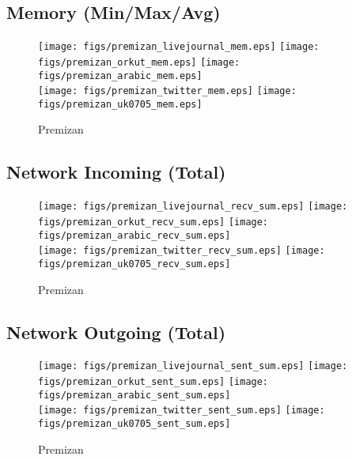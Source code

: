 \documentclass{article}
\newcommand{\bline}[1][1]{\vspace{#1\baselineskip}}
\begin{document}
\subsection{Memory (Min/Max/Avg)}
\begin{figure}[!h]
  \centering
  \texttt{[image: figs/premizan\_livejournal\_mem.eps]}\hspace{1em}%
  \texttt{[image: figs/premizan\_orkut\_mem.eps]}\hspace{1em}%
  \texttt{[image: figs/premizan\_arabic\_mem.eps]}\\
  \texttt{[image: figs/premizan\_twitter\_mem.eps]}\hspace{1em}%
  \texttt{[image: figs/premizan\_uk0705\_mem.eps]}
  \caption{Premizan}
\end{figure}

\pagebreak
\subsection{Network Incoming (Total)}
\begin{figure}[!h]
  \bline[1]
  \centering
  \texttt{[image: figs/premizan\_livejournal\_recv\_sum.eps]}\hspace{1em}%
  \texttt{[image: figs/premizan\_orkut\_recv\_sum.eps]}\hspace{1em}%
  \texttt{[image: figs/premizan\_arabic\_recv\_sum.eps]}\\
  \texttt{[image: figs/premizan\_twitter\_recv\_sum.eps]}\hspace{1em}%
  \texttt{[image: figs/premizan\_uk0705\_recv\_sum.eps]}
  \caption{Premizan}
\end{figure}

\pagebreak
\subsection{Network Outgoing (Total)}
\begin{figure}[!h]
  \bline[1]
  \centering
  \texttt{[image: figs/premizan\_livejournal\_sent\_sum.eps]}\hspace{1em}%
  \texttt{[image: figs/premizan\_orkut\_sent\_sum.eps]}\hspace{1em}%
  \texttt{[image: figs/premizan\_arabic\_sent\_sum.eps]}\\
  \texttt{[image: figs/premizan\_twitter\_sent\_sum.eps]}\hspace{1em}%
  \texttt{[image: figs/premizan\_uk0705\_sent\_sum.eps]}
  \caption{Premizan}
\end{figure}
\end{document}
